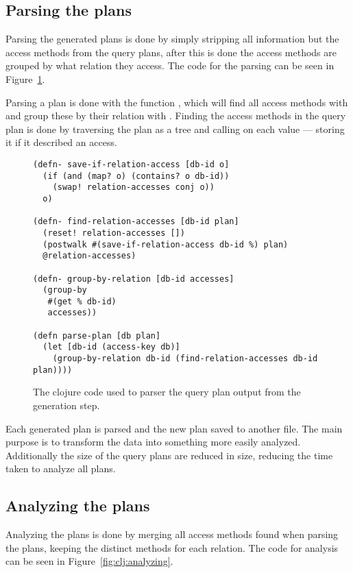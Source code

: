 \subsection{Parsing the plans}\label{sec:parsing}
Parsing the generated plans is done by simply stripping all information but the
access methods from the query plans, after this is done the access methods are
grouped by what relation they access. The code for the parsing can be seen in
Figure~\ref{fig:clj:parsing}.

Parsing a plan is done with the function , which will find all
access methods with  and group these by their relation
with . Finding the access methods in the query plan is
done by traversing the plan as a tree and calling 
on each value --- storing it if it described an access.

\begin{figure}[ht]
\begin{verbatim}
(defn- save-if-relation-access [db-id o]
  (if (and (map? o) (contains? o db-id))
    (swap! relation-accesses conj o))
  o)

(defn- find-relation-accesses [db-id plan]
  (reset! relation-accesses [])
  (postwalk #(save-if-relation-access db-id %) plan)
  @relation-accesses)

(defn- group-by-relation [db-id accesses]
  (group-by
   #(get % db-id)
   accesses))

(defn parse-plan [db plan]
  (let [db-id (access-key db)]
    (group-by-relation db-id (find-relation-accesses db-id plan))))
   \end{verbatim}
   \caption[The clojure code to parse a query]{The clojure code used to parser
     the query plan output from the generation step.}
\label{fig:clj:parsing}
\end{figure}

Each generated plan is parsed and the new plan saved to another file. The main
purpose is to transform the data into something more easily analyzed.
Additionally the size of the query plans are reduced in size, reducing the
time taken to analyze all plans.

\subsection{Analyzing the plans}\label{sec:analyzingplans}
Analyzing the plans is done by merging all access methods found when parsing the
plans, keeping the distinct methods for each relation. The code for analysis can
be seen in Figure~\ref{fig:clj:analyzing}.

